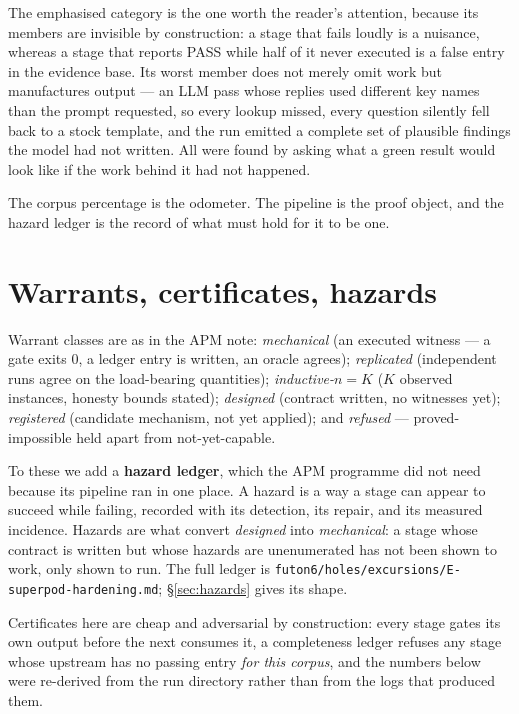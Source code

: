 \documentclass[11pt]{article}
\newcommand{\warrant}[1]{\textsl{#1}}
\begin{document}
The emphasised category is the one worth the reader's attention, because its
members are invisible by construction: a stage that fails loudly is a nuisance,
whereas a stage that reports PASS while half of it never executed is a false
entry in the evidence base. Its worst member does not merely omit work but
manufactures output --- an LLM pass whose replies used different key names than
the prompt requested, so every lookup missed, every question silently fell back
to a stock template, and the run emitted a complete set of plausible findings the
model had not written. All were found by asking what a green result would
look like if the work behind it had not happened.

The corpus percentage is the odometer. The pipeline is the proof object, and
the hazard ledger is the record of what must hold for it to be one.

\section{Warrants, certificates, hazards}

Warrant classes are as in the APM note: \warrant{mechanical} (an executed
witness --- a gate exits 0, a ledger entry is written, an oracle agrees);
\warrant{replicated} (independent runs agree on the load-bearing quantities);
\warrant{inductive-$n{=}K$} ($K$ observed instances, honesty bounds stated);
\warrant{designed} (contract written, no witnesses yet); \warrant{registered}
(candidate mechanism, not yet applied); and \warrant{refused} ---
proved-impossible held apart from not-yet-capable.

To these we add a \textbf{hazard ledger}, which the APM programme did not need
because its pipeline ran in one place. A hazard is a way a stage can appear to
succeed while failing, recorded with its detection, its repair, and its
measured incidence. Hazards are what convert \warrant{designed} into
\warrant{mechanical}: a stage whose contract is written but whose hazards are
unenumerated has not been shown to work, only shown to run. The full ledger is
\texttt{futon6/holes/excursions/E-superpod-hardening.md}; \S\ref{sec:hazards}
gives its shape.

Certificates here are cheap and adversarial by construction: every stage gates
its own output before the next consumes it, a completeness ledger refuses any
stage whose upstream has no passing entry \emph{for this corpus}, and the
numbers below were re-derived from the run directory rather than from the logs
that produced them.
\end{document}
